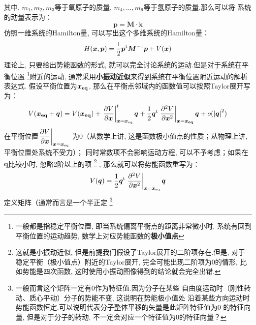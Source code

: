     其中, $m_1,m_2,m_3$等于氧原子的质量, $m_4,...,m_9$等于氢原子的质量.那么可以将
    系统的动量表示为：
    \begin{equation}
        \bm{p} = \bm{M}\cdot\dot{\bm{x}}
    \end{equation}
    仿照一维系统的Hamilton量, 可以写出这个多维系统的Hamilton量：
    \begin{equation}
        H(\bm{x}, \bm{p}) = \frac{1}{2}\bm{p}^{\mathrm{t}}\bm{M}^{-1}\bm{p} + V(\bm{x})
    \end{equation}
    理论上, 只要给出势能函数的形式, 就可以完全讨论系统的运动.但是对于系统在平衡位置
    \footnote{一般都是指稳定平衡位置, 即当系统偏离平衡点的距离非常微小时, 
    系统有回到平衡位置的运动趋势, 数学上对应势能函数的\textbf{极小值点}
    }附近的运动, 通常采用\textbf{小振动近似}来得到系统在平衡位置附近运动的解析表达式.
    假设平衡位置为$\bm{x_{\mathrm{eq}}}$, 那么在平衡点邻域内的函数值可以按照Taylor展开写为：
    \begin{equation}
        \begin{split}
        V(\bm{x_{\mathrm{eq}}} + \bm{q}) &= V(\bm{x_{\mathrm{eq}}}) + \left.\frac{\partial{V}}{\partial{\bm{x}}}\right|_{\bm{x} = \bm{x}_{\mathrm{eq}}}^{\mathrm{t}}\bm{q}
         + \frac{1}{2}\bm{q}^{\mathrm{t}}\left.\frac{\partial{^2V}}{\partial{\bm{x}^2}}\right|_{\bm{x} = \bm{x_{\mathrm{eq}}}}\bm{q} + o(\left|\bm{q}\right|^2)\\
        \end{split}
    \end{equation}
    在平衡位置$\displaystyle\left.\frac{\partial{V}}{\partial{\bm{x}}}\right|_{\bm{x} = \bm{x}_{\mathrm{eq}}}$
    为0（从数学上讲, 这是函数极小值点的性质；从物理上讲, 平衡位置处系统不受力）；
    同时常数项不会影响运动方程, 可以不予考虑；如果在$\bm{q}$比较小时, 忽略2阶以上的项
    \footnote{这就是小振动近似, 但是前提我们假设了Taylor展开的二阶项存在.但是, 
    对于稳定平衡（极小值点）附近的Taylor展开, 完全可能出现二阶项为0的情形, 
    比如势能是四次函数, 这时使用小振动图像得到的结论就会完全出错.
    }
    , 那么就可以将势能函数重写为：
    \begin{equation}
        V(\bm{q}) = \frac{1}{2}\bm{q}^{\mathrm{t}}\left.\frac{\partial{^2V}}{\partial{\bm{x}^2}}\right|_{\bm{x} = \bm{x}_{\mathrm{eq}}}\bm{q}
        \label{potential at equilibrium point}
    \end{equation}
    定义矩阵（通常而言是一个半正定
    \footnote{
        一般而言这个矩阵一定有0作为特征值.因为分子在某些
        自由度运动时（刚性转动、质心平动）分子的势能不变, 这说明在势能极小值处
        沿着某些方向运动时势能函数恒定.可以说明代表分子整体平移的矢量是此矩阵特征值为0
        的特征向量, 但是对于分子的转动, 不一定会对应一个特征值为0的特征向量？
    }
